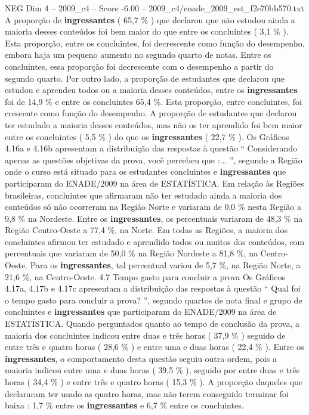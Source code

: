 \begin{textsample}{NEG Dim 4 – 2009\_c4 – Score -6.00 – 2009\_c4/enade\_2009\_est\_f2e70bb570.txt}
A proporção de \textbf{ingressantes} ( 65,7 \% ) que declarou que não estudou ainda a maioria desses conteúdos foi bem maior do que entre os concluintes ( 3,1 \% ).
Esta proporção, entre os concluintes, foi decrescente como função do desempenho, embora haja um pequeno aumento no segundo quarto de notas.
Entre os concluintes, essa proporção foi decrescente com o desempenho a partir do segundo quarto.
Por outro lado, a proporção de estudantes que declarou que estudou e aprendeu todos ou a maioria desses conteúdos, entre os \textbf{ingressantes} foi de 14,9 \% e entre os concluintes 65,4 \%.
Esta proporção, entre concluintes, foi crescente como função do desempenho.
A proporção de estudantes que declarou ter estudado a maioria desses conteúdos, mas não os ter aprendido foi bem maior entre os concluintes ( 5,5 \% ) do que os \textbf{ingressantes} ( 22,7 \% ).
Os Gráficos 4.16a e 4.16b apresentam a distribuição das respostas à questão “ Considerando apenas as questões objetivas da prova, você percebeu que :... ”, segundo a Região onde o curso está situado para os estudantes concluintes e \textbf{ingressantes} que participaram do ENADE/2009 na área de ESTATÍSTICA.
Em relação às Regiões brasileiras, concluintes que afirmaram não ter estudado ainda a maioria dos conteúdos só não ocorreram na Região Norte e variaram de 0,0 \% nesta Região a 9,8 \% na Nordeste.
Entre os \textbf{ingressantes}, os percentuais variaram de 48,3 \% na Região Centro-Oeste a 77,4 \%, na Norte.
Em todas as Regiões, a maioria dos concluintes afirmou ter estudado e aprendido todos ou muitos dos conteúdos, com percentuais que variaram de 50,0 \% na Região Nordeste a 81,8 \%, na Centro-Oeste.
Para os \textbf{ingressantes}, tal percentual variou de 5,7 \%, na Região Norte, a 21,6 \%, na Centro-Oeste. 4.7 Tempo gasto para concluir a prova Os Gráficos 4.17a, 4.17b e 4.17c apresentam a distribuição das respostas à questão “ Qual foi o tempo gasto para concluir a prova? ”, segundo quartos de nota final e grupo de concluintes e \textbf{ingressantes} que participaram do ENADE/2009 na área de ESTATÍSTICA.
Quando perguntados quanto ao tempo de conclusão da prova, a maioria dos concluintes indicou entre duas e três horas ( 37,9 \% ) seguido de entre três e quatro horas ( 28,6 \% ) e entre uma e duas horas ( 22,4 \% ).
Entre os \textbf{ingressantes}, o comportamento desta questão seguiu outra ordem, pois a maioria indicou entre uma e duas horas ( 39,5 \% ), seguido por entre duas e três horas ( 34,4 \% ) e entre três e quatro horas ( 15,3 \% ).
A proporção daqueles que declararam ter usado as quatro horas, mas não terem conseguido terminar foi baixa : 1,7 \% entre os \textbf{ingressantes} e 6,7 \% entre os concluintes.

\end{textsample}
